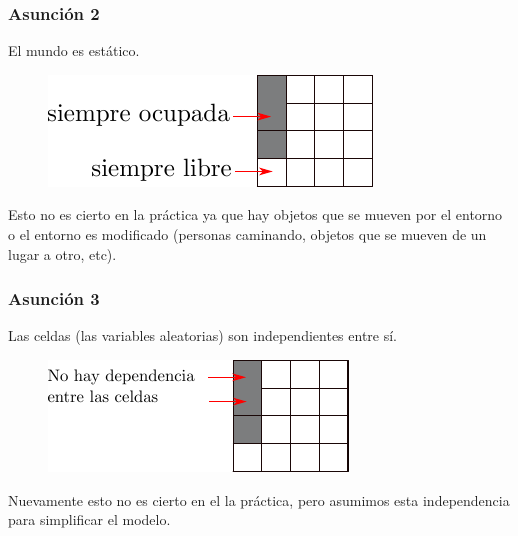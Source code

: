 \begin{frame}
    \frametitle{Asunción 2}
    El mundo es estático.
    
     	\begin{figure}[!h]
    	\includegraphics[width=0.7\columnwidth]{./images/grid_map_static_assumption.pdf}
    \end{figure}
    
    Esto no es cierto en la práctica ya que hay objetos que se mueven por el entorno o el entorno es modificado (personas caminando, objetos que se mueven de un lugar a otro, etc).
    
\end{frame}

\begin{frame}
	\frametitle{Asunción 3}
	Las celdas (las variables aleatorias) son independientes entre sí.
	
	\begin{figure}[!h]
		\includegraphics[width=0.7\columnwidth]{./images/grid_map_independency_assumption.pdf}
	\end{figure}
	
	Nuevamente esto no es cierto en el la práctica, pero asumimos esta independencia para simplificar el modelo.
	
\end{frame}

